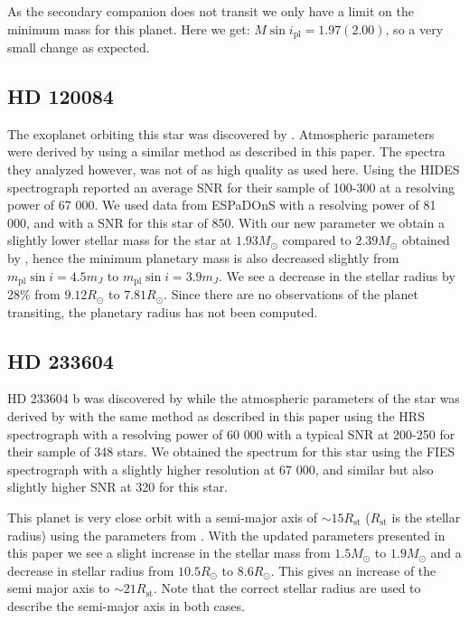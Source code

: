 \documentclass{aa}
\begin{document}
As the secondary companion does not transit we only have a limit on the minimum
mass for this planet. Here we get: $M\sin i_\mathrm{pl} = 1.97(2.00)$, so a very
small change as expected.


\subsection{HD 120084}
\label{sub:HD_120084}
The exoplanet orbiting this star was discovered by \citet{Sato2013}. Atmospheric
parameters were derived by \citet{Takeda2008} using a similar method as
described in this paper. The spectra they analyzed however, was not of as high
quality as used here. Using the HIDES spectrograph \citet{Takeda2008} reported
an average SNR for their sample of 100-300 at a resolving power of 67 000. We
used data from ESPaDOnS with a resolving power of 81 000, and with a SNR for
this star of 850. With our new parameter we obtain a slightly lower stellar mass
for the star at $1.93M_\odot$ compared to $2.39M_\odot$ obtained by
\cite{Takeda2008}, hence the minimum planetary mass is also decreased slightly
from $m_\mathrm{pl}\sin i=4.5m_J$ to $m_\mathrm{pl}\sin i=3.9m_J$. We see a
decrease in the stellar radius by 28\% from $9.12R_\odot$ to $7.81R_\odot$.
Since there are no observations of the planet transiting, the planetary radius
has not been computed.


\subsection{HD 233604}
\label{sub:HD_233604}
HD 233604 b was discovered by \citet{Nowak2013} while the atmospheric
parameters of the star was derived by \citet{Zielinski2012} with the same
method as described in this paper using the HRS spectrograph with a resolving
power of 60 000 with a typical SNR at 200-250 for their sample of 348 stars.
We obtained the spectrum for this star using the FIES spectrograph with a
slightly higher resolution at 67 000, and similar but also slightly higher
SNR at 320 for this star.

This planet is very close orbit with a semi-major axis of $\sim 15R_\mathrm{st}$
($R_\mathrm{st}$ is the stellar radius) using the parameters from
\citet{Nowak2013}. With the updated parameters presented in this paper we see a
slight increase in the stellar mass from $1.5M_\odot$ to $1.9M_\odot$ and a
decrease in stellar radius from $10.5R_\odot$ to $8.6R_\odot$. This gives an
increase of the semi major axis to $\sim 21R_\mathrm{st}$. Note that the correct
stellar radius are used to describe the semi-major axis in both cases.
\end{document}
